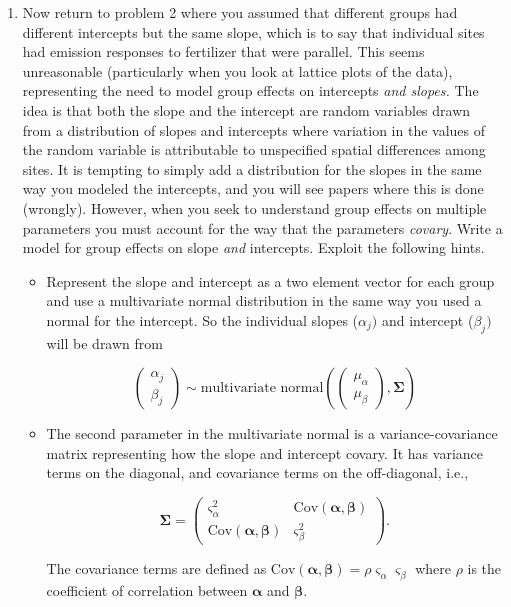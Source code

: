 \documentclass[12pt, oneside]{article}
\begin{document}
\begin{enumerate} [leftmargin=*]
\item Now return to problem 2 where you assumed that different groups had different intercepts but the same slope, which is to say that individual sites had emission responses to fertilizer that were parallel. This seems unreasonable (particularly when you look at lattice plots of the data), representing the need to model group effects on intercepts \emph{and slopes.} The idea is that both the slope and the intercept are random variables drawn from a distribution of slopes and intercepts where variation in the values of the random variable is attributable to unspecified spatial differences among sites. It is tempting to simply add a distribution for the slopes in the same way you modeled the intercepts, and you will see papers where this is done (wrongly). However, when you seek to understand group effects on multiple parameters you must account for the way that the parameters \emph{covary}. Write a model for group effects on slope \emph{and} intercepts. Exploit the following hints.

\begin{itemize}
\item Represent the slope and intercept as a two element vector for each group and use a multivariate normal distribution in the same way you used a normal for the intercept. So the individual slopes ($\alpha_{j})$ and intercept ($\beta_{j})$ will be drawn from 

\begin{equation*}
\left(\begin{array}{c}
\alpha_{j}\\
\beta_{j}
\end{array}\right)\sim\text{multivariate normal}\left(\left(\begin{array}{c}
\mu_{\alpha}\\
\mu_{\beta}
\end{array}\right),\bm{\Sigma}\right)
\end{equation*}
\vspace{5mm}

\item The second parameter in the multivariate normal is a variance-covariance matrix representing how the slope and intercept covary. It has variance terms on the diagonal, and covariance terms on the off-diagonal, i.e., 

\begin{equation*}
\bm{\Sigma}=\left(\begin{array}{cc}
\varsigma_{\alpha}^{2} & \text{Cov}(\bm{\alpha},\bm{\beta})\\
\text{Cov}(\bm{\alpha},\bm{\beta}) & \varsigma_{\beta}^{2}
\end{array}\right).
\end{equation*}
\vspace{5mm}

The covariance terms are defined as $\text{Cov}(\bm{\alpha},\bm{\beta})=\rho\varsigma_{\alpha}\varsigma_{\beta}$ where $\rho$ is the coefficient of correlation between $\bm{\alpha}$ and $\bm{\beta}$.
\end{itemize}
\end{enumerate}
\end{document}
